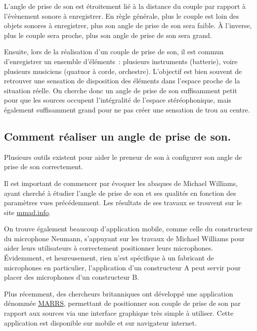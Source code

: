 \documentclass[
]{book}
\begin{document}
L'angle de prise de son est étroitement lié à la distance du couple par rapport à l'évènement sonore à enregistrer. En règle générale, plus le couple est loin des objets sonores à enregistrer, plus son angle de prise de son sera faible. À l'inverse, plus le couple sera proche, plus son angle de prise de son sera grand.

Ensuite, lors de la réalisation d'un couple de prise de son, il est commun d'enregistrer un ensemble d'éléments~: plusieurs instruments (batterie), voire plusieurs musiciens (quatuor à corde, orchestre). L'objectif est bien souvent de retrouver une sensation de disposition des éléments dans l'espace proche de la situation réelle. On cherche donc un angle de prise de son suffisamment petit pour que les sources occupent l'intégralité de l'espace stéréophonique, mais également suffisamment grand pour ne pas créer une sensation de trou au centre.

\hypertarget{comment-ruxe9aliser-un-angle-de-prise-de-son.}{%
\subsection{Comment réaliser un angle de prise de son.}\label{comment-ruxe9aliser-un-angle-de-prise-de-son.}}

Plusieurs outils existent pour aider le preneur de son à configurer son angle de prise de son correctement.

Il est important de commencer par évoquer les abaques de Michael Williams, ayant cherché à étudier l'angle de prise de son et ses qualités en fonction des paramètres vues précédemment. Les résultats de ses travaux se trouvent sur le site \href{https://www.mmad.info/MAD/2\%20Ch/2ch.htm}{mmad.info}.

On trouve également beaucoup d'application mobile, comme celle du constructeur du microphone Neumann, s'appuyant sur les travaux de Michael Williams pour aider leurs utilisateurs à correctement positionner leurs microphones. Évidemment, et heureusement, rien n'est spécifique à un fabricant de microphones en particulier, l'application d'un constructeur A peut servir pour placer des microphones d'un constructeur B.

Plus récemment, des chercheurs britanniques ont développé une application dénommée \href{https://marrsweb.hud.ac.uk/}{MARRS}, permettant de positionner son couple de prise de son par rapport aux sources via une interface graphique très simple à utiliser. Cette application est disponible sur mobile et sur navigateur internet.
\end{document}
